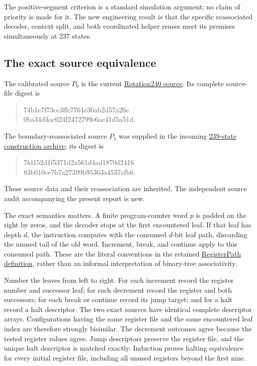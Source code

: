 The positive-segment criterion is a standard simulation argument; no claim
of priority is made for it.  The new engineering result is that the
specific reassociated decoder, context split, and both coordinated helper
reuses meet its premises simultaneously at 237 states.

\subsection{The exact source equivalence}

The calibrated source $P_0$ is the current
\href{https://github.com/VladimirReshetnikov/ProveIt/blob/ce192939372ac7944fe2a0208c68a96d49fb5e3b/Computability/BusyBeaver/Research/ZFC/candidate-rotation240/sites_logical.json}
{Rotation240 source}.  Its complete source-file digest is
\begin{quote}\small\ttfamily
74b1e7f73cc3ffe7761e36ab2d57a26e\\
0ba34d3ac624f2472799e6ac41d5a51d.
\end{quote}
The boundary-reassociated source $P_1$ was supplied in the incoming
\href{https://github.com/VladimirReshetnikov/ProveIt/blob/ce192939372ac7944fe2a0208c68a96d49fb5e3b/docs/incoming/ZFC_239_State_Construction_2026-10-19.zip}
{239-state construction archive}; its digest is
\begin{quote}\small\ttfamily
7fd152d1f5371d2a561d4ad1870d2416\\
83b010ce7b7a27399b95363a4537cfb6.
\end{quote}
These source data and their reassociation are inherited.  The independent
source audit accompanying the present report is new.

The exact semantics matters.  A finite program-counter word $p$ is padded
on the right by zeros, and the decoder stops at the first encountered
leaf.  If that leaf has depth $d$, the instruction computes with the
consumed $d$-bit leaf path, discarding the unused tail of the old word.
Increment, break, and continue apply to this consumed path.  These are the
literal conventions in the retained
\href{https://github.com/VladimirReshetnikov/ProveIt/blob/ce192939372ac7944fe2a0208c68a96d49fb5e3b/Computability/BusyBeaver/Lean/BusyBeaver/ZFC/RegisterPath.lean}
{RegisterPath definition}, rather than an informal interpretation of
binary-tree associativity.

Number the leaves from left to right.  For each increment record the
register number and successor leaf; for each decrement record the
register and both successors; for each break or continue record its jump
target; and for a halt record a halt descriptor.  The two exact sources
have identical complete descriptor arrays.  Configurations having the
same register file and the same encountered leaf index are therefore
strongly bisimilar.  The decrement outcomes agree because the tested
register values agree.  Jump descriptors preserve the register file,
and the unique halt descriptor is matched exactly.  Induction proves
halting equivalence for every initial register file, including all unused
registers beyond the first nine.

